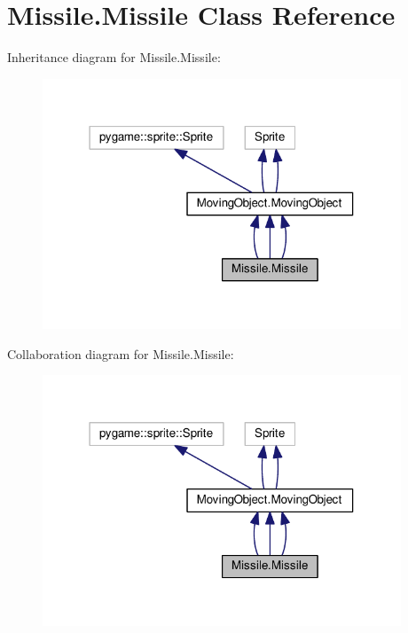 \hypertarget{classMissile_1_1Missile}{}\section{Missile.\+Missile Class Reference}
\label{classMissile_1_1Missile}


Inheritance diagram for Missile.\+Missile\+:\nopagebreak
\begin{figure}[H]
\begin{center}
\leavevmode
\includegraphics[width=303pt]{classMissile_1_1Missile__inherit__graph}
\end{center}
\end{figure}


Collaboration diagram for Missile.\+Missile\+:\nopagebreak
\begin{figure}[H]
\begin{center}
\leavevmode
\includegraphics[width=303pt]{classMissile_1_1Missile__coll__graph}
\end{center}
\end{figure}

